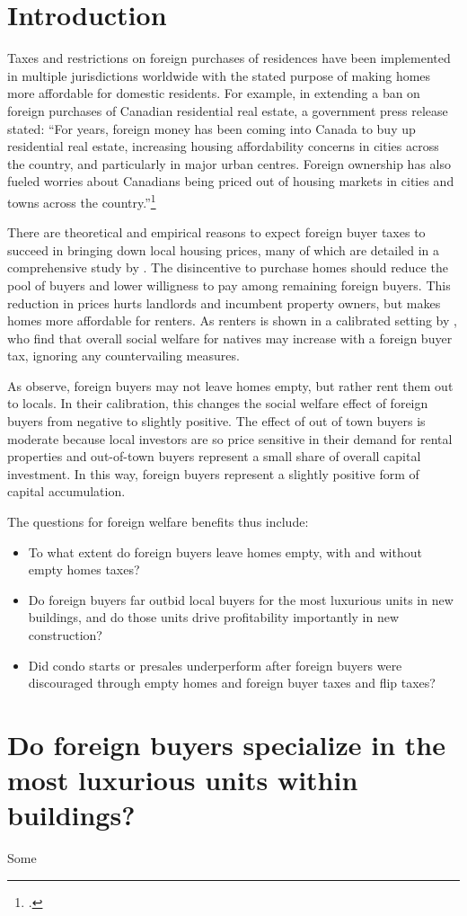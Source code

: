 \documentclass[12pt]{article}
\begin{document}
\section{Introduction}

Taxes and restrictions on foreign purchases of residences have been implemented in multiple jurisdictions worldwide with the stated purpose of making homes more affordable for domestic residents. For example, in extending a ban on foreign purchases of Canadian residential real estate, a government press release stated: ``For years, foreign money has been coming into Canada to buy up residential real estate, increasing housing affordability concerns in cities across the country, and particularly in major urban centres. Foreign ownership has also fueled worries about Canadians being priced out of housing markets in cities and towns across the country.''\footnote{\textcite{gOC}.}

There are theoretical and empirical reasons to expect foreign buyer taxes to succeed in bringing down local housing prices, many of which are detailed in a comprehensive study by \textcite{favilukisVanNieuwerburgh}. The disincentive to purchase homes should reduce the pool of buyers and lower willigness to pay among remaining foreign buyers. This reduction in prices hurts landlords and incumbent property owners, but makes homes more affordable for renters. As renters is shown in a calibrated setting by , who find that overall social welfare for natives may increase with a foreign buyer tax, ignoring any countervailing measures. 

As \textcite{favilukisVanNieuwerburgh} observe, foreign buyers may not leave homes empty, but rather rent them out to locals. In their calibration, this changes the social welfare effect of foreign buyers from negative to slightly positive. The effect of out of town buyers is moderate because local investors are so price sensitive in their demand for rental properties and out-of-town buyers represent a small share of overall capital investment. In this way, foreign buyers represent a slightly positive form of capital accumulation.

The questions for foreign welfare benefits thus include:

\begin{itemize}
	\item To what extent do foreign buyers leave homes empty, with and without empty homes taxes?
	\item Do foreign buyers far outbid local buyers for the most luxurious units in new buildings, and do those units drive profitability importantly in new construction?
	\item Did condo starts or presales underperform after foreign buyers were discouraged through empty homes and foreign buyer taxes and flip taxes?
\end{itemize}

\section{Do foreign buyers specialize in the most luxurious units within buildings?}

Some 
\end{document}
